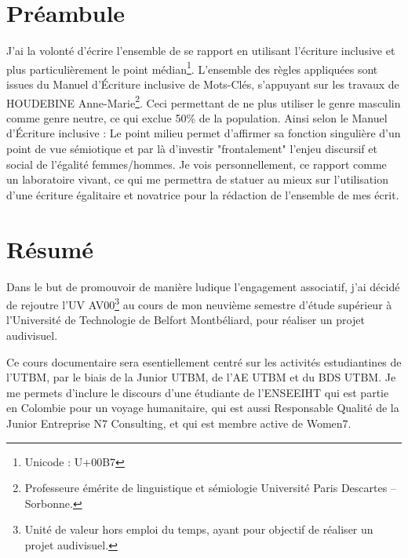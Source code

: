 \documentclass{librairies/lib}
\begin{document}



\newpage
\pagestyle{no_number}

\section*{Préambule}

J'ai la volonté d'écrire l'ensemble de se rapport en utilisant l'écriture inclusive et plus particulièrement le point médian\footnote{Unicode : U+00B7}.
L'ensemble des règles appliquées sont issues du Manuel d’Écriture inclusive\cite{MEI} de Mots-Clés, s'appuyant sur les travaux de HOUDEBINE Anne-Marie\footnote{Professeure émérite de linguistique et sémiologie Université Paris Descartes – Sorbonne.}.
Ceci permettant de ne plus utiliser le genre masculin comme genre neutre, ce qui exclue 50\% de la population.
Ainsi selon le Manuel d’Écriture inclusive : \og Le point milieu permet d'affirmer sa fonction singulière d'un point de vue sémiotique et par là d'investir "frontalement" l'enjeu discursif et social de l'égalité femmes/hommes. \fg{}
Je vois personnellement, ce rapport comme un laboratoire vivant, ce qui me permettra de statuer au mieux sur l'utilisation d'une écriture égalitaire et novatrice pour la rédaction de l'ensemble de mes écrit.


\newpage


\section*{Résumé}

Dans le but de promouvoir de manière ludique l'engagement associatif, j'ai décidé de rejoutre l'UV AV00\footnote{Unité de valeur hors emploi du temps, ayant pour objectif de réaliser un projet audivisuel.} au cours de mon neuvième semestre d'étude supérieur à l'Université de Technologie de Belfort Montbéliard, pour réaliser un projet audivisuel.

Ce cours documentaire sera esentiellement centré sur les activités estudiantines de l'UTBM, par le biais de la Junior UTBM, de l'AE UTBM et du BDS UTBM.
Je me permets d'inclure le discours d'une étudiante de l'\gls{ENSEEIHT} qui est partie en Colombie pour un voyage humanitaire, qui est aussi Responsable Qualité de la Junior Entreprise N7 Consulting, et qui est membre active de Women7.
\end{document}
